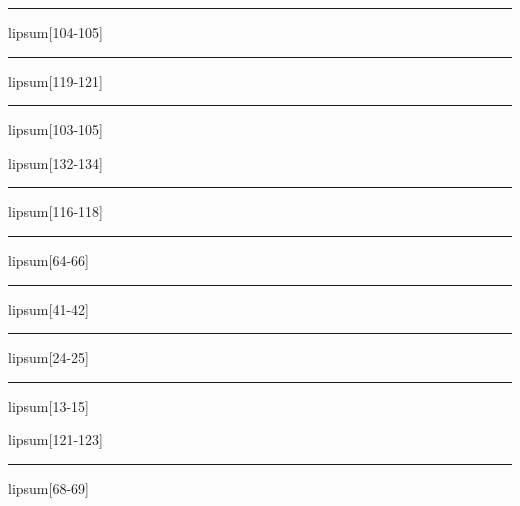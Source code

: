 \documentclass[11pt,a4paper]{article}
\begin{document}
\begin{simplewrap}
  \textcolor{magenta!28}{\rule{4.9cm}{4.4cm}}
\end{simplewrap}
lipsum[104-105]

\begin{simplewrap}
  \textcolor{green!54}{\rule{3.2cm}{5.5cm}}
\end{simplewrap}
lipsum[119-121]

\begin{simplewrap}
  \textcolor{purple!30}{\rule{5.6cm}{4.6cm}}
\end{simplewrap}
lipsum[103-105]

lipsum[132-134]

\begin{simplewrap}
  \textcolor{magenta!16}{\rule{4.0cm}{5.7cm}}
\end{simplewrap}
lipsum[116-118]

\begin{simplewrap}
  \textcolor{orange!13}{\rule{3.9cm}{5.1cm}}
\end{simplewrap}
lipsum[64-66]

\begin{simplewrap}
  \textcolor{cyan!30}{\rule{5.8cm}{7.8cm}}
\end{simplewrap}
lipsum[41-42]

\begin{simplewrap}
  \textcolor{cyan!39}{\rule{4.5cm}{4.5cm}}
\end{simplewrap}
lipsum[24-25]

\begin{simplewrap}
  \textcolor{cyan!39}{\rule{5.9cm}{3.7cm}}
\end{simplewrap}
lipsum[13-15]

lipsum[121-123]

\begin{simplewrap}
  \textcolor{violet!44}{\rule{3.0cm}{2.9cm}}
\end{simplewrap}
lipsum[68-69]
\end{document}
